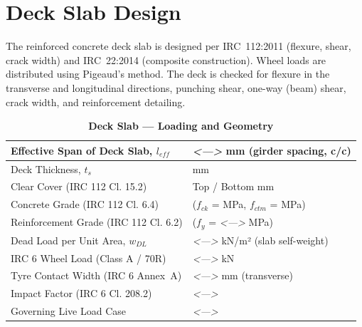 \documentclass[12pt,a4paper]{report}
\numberwithin{table}{chapter}
\numberwithin{figure}{chapter}
\newcommand{\placeholder}[1]{\textit{\textless #1\textgreater}}
\begin{document}
\section{Deck Slab Design}
\label{sec:deck-design}

The reinforced concrete deck slab is designed per IRC~112:2011 (flexure, shear, crack width) and IRC~22:2014 (composite construction). Wheel loads are distributed using Pigeaud's method. The deck is checked for flexure in the transverse and longitudinal directions, punching shear, one-way (beam) shear, crack width, and reinforcement detailing.

\vspace{1em}
\begin{longtable}{|L{5.5cm}|p{10.0cm}|}
\caption{\textbf{Deck Slab --- Loading and Geometry}}\\
\hline
\textnormal{Effective Span of Deck Slab, $l_{eff}$} & \placeholder{---} mm (girder spacing, c/c) \\[6pt]
\hline
\textnormal{Deck Thickness, $t_s$} &  mm \\[6pt]
\hline
\textnormal{Clear Cover (IRC 112 Cl. 15.2)} & Top  / Bottom  mm \\[6pt]
\hline
\textnormal{Concrete Grade (IRC 112 Cl. 6.4)} &  ($f_{ck}$ =  MPa, $f_{ctm}$ =  MPa) \\[6pt]
\hline
\textnormal{Reinforcement Grade (IRC 112 Cl. 6.2)} &  ($f_y$ = \placeholder{---} MPa) \\[6pt]
\hline
\textnormal{Dead Load per Unit Area, $w_{DL}$} & \placeholder{---} kN/m² (slab self-weight) \\[6pt]
\hline
\textnormal{IRC 6 Wheel Load (Class A / 70R)} & \placeholder{---} kN \\[6pt]
\hline
\textnormal{Tyre Contact Width (IRC 6 Annex~A)} & \placeholder{---} mm (transverse) \\[6pt]
\hline
\textnormal{Impact Factor (IRC 6 Cl. 208.2)} & \placeholder{---} \\[6pt]
\hline
\textnormal{Governing Live Load Case} & \placeholder{---} \\[6pt]
\hline
\end{longtable}
\end{document}
